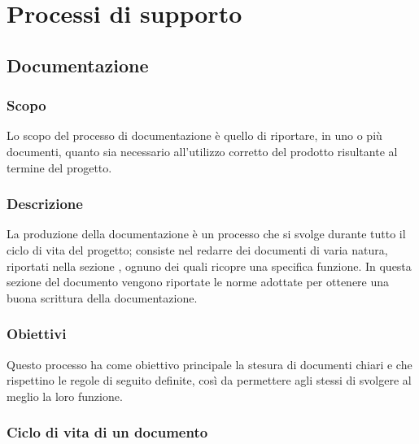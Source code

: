 \section{Processi di supporto}
\label{sec:processi_di_supporto}

\subsection{Documentazione}
\label{sub:doc}

\subsubsection{Scopo}
\label{ssub:documentazione:scopo}
Lo scopo del processo di documentazione è quello di riportare, in uno o più documenti, quanto sia necessario all'utilizzo corretto del 
prodotto risultante al termine del progetto.

\subsubsection{Descrizione}
\label{ssub:documentazione:descrizione}
La produzione della documentazione è un processo che si svolge durante tutto il ciclo di vita del progetto; consiste nel redarre dei 
documenti di varia natura, riportati nella sezione , ognuno dei quali ricopre una specifica funzione. In 
questa sezione del documento vengono riportate le norme adottate per ottenere una buona scrittura della documentazione.

\subsubsection{Obiettivi}
\label{ssub:documentazione:obiettivi}
Questo processo ha come obiettivo principale la stesura di documenti chiari e che rispettino le regole di seguito definite, così da 
permettere agli stessi di svolgere al meglio la loro funzione.

\subsubsection{Ciclo di vita di un documento}
\label{ssub:ciclo_vita_doc}

